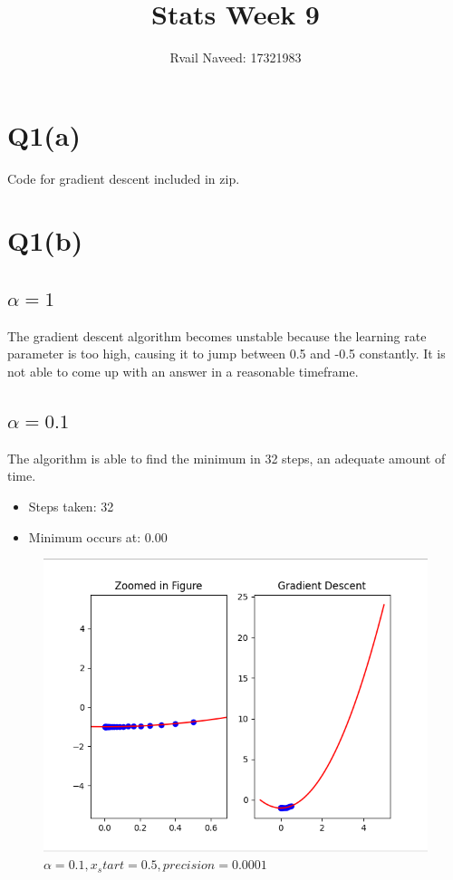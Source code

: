 \documentclass{article}
\title{Stats Week 9}
\author{Rvail Naveed: 17321983}
\begin{document}
    \maketitle
     

    \section*{Q1(a)}
        Code for gradient descent included in zip.

    \section*{Q1(b)}
        \subsection{$\alpha = 1$}
            The gradient descent algorithm becomes unstable because the learning rate parameter 
            is too high, causing it to jump between 0.5 and -0.5 constantly. It is not able to come 
            up with an answer in a reasonable timeframe.
    \pagebreak

        \subsection{$\alpha = 0.1$}
            The algorithm is able to find the minimum in 32 steps, an adequate amount of time.
            \begin{itemize}
                \item Steps taken: 32
                \item Minimum occurs at: 0.00
            \end{itemize}
            \begin{figure}[h]
                \includegraphics[scale=0.5]{a.png}
                \caption{$\alpha = 0.1, x_start = 0.5, precision = 0.0001$}
            \end{figure}
\end{document}
